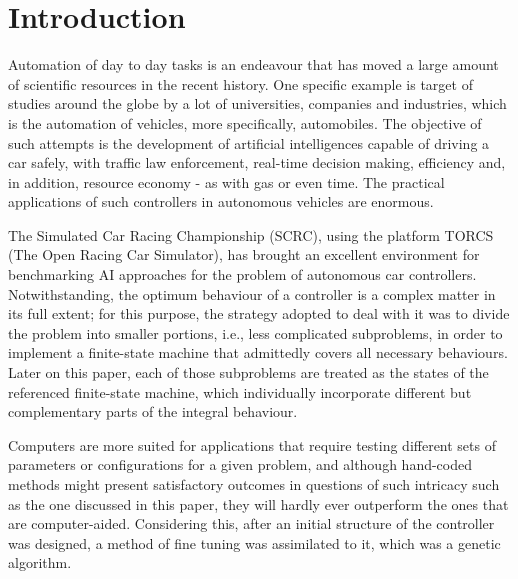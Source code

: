 \section{\textbf{Introduction}}
	
	Automation of day to day tasks is an endeavour that has moved a large amount of scientific resources in the
	recent history. One specific example is target of studies around the globe by a lot of universities, companies
	and industries, which is the automation of vehicles, more specifically, automobiles. The objective of such
	attempts is the development of artificial intelligences capable of driving a car safely, with traffic law
	enforcement, real-time decision making, efficiency and, in addition, resource economy - as with gas or even
	time. The practical applications of such controllers in autonomous vehicles are enormous.

	The Simulated Car Racing Championship (SCRC), using the platform TORCS (The Open Racing Car Simulator), has
	brought an excellent environment for benchmarking AI approaches for the problem of autonomous car controllers.
	Notwithstanding, the optimum behaviour of a controller is a complex matter in its full extent; for this purpose,
	the strategy adopted to deal with it was to divide the problem into smaller portions, i.e., less complicated
	subproblems, in order to implement a finite-state machine that admittedly covers all necessary behaviours. Later
	on this paper, each of those subproblems are treated as the states of the referenced finite-state machine, which
	individually incorporate different but complementary parts of the integral behaviour.
	
	Computers are more suited for applications that require testing different sets of parameters or configurations for
	a given problem, and although hand-coded methods might present satisfactory outcomes in questions of such
	intricacy such as the one discussed in this paper, they will hardly ever outperform the ones that are
	computer-aided. Considering this, after an initial structure of the controller was designed, a method of fine
	tuning was assimilated to it, which was a genetic algorithm.
	
